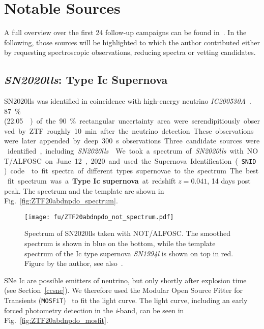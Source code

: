 \section{Notable Sources}
A full overview over the first 24 follow-up campaigns can be found in~. In the following, those sources will be highlighted to which the author contributed either by requesting spectroscopic observations, reducing spectra or vetting candidates.

\subsection{\emph{SN2020lls}: Type Ic Supernova}\label{SN2020lls}
SN2020lls was identified in coincidence with high-energy neutrino \emph{IC200530A}~. \SI{87}{\percent} (\SI{22.05}{\square\deg}) of the \SI{90}{\percent} rectangular uncertainty area were serendipitiously observed by ZTF roughly \SI{10}{\minute} after the neutrino detection. These observations were later appended by deep \SI{300}{\second} observations Three candidate sources were identified, including \emph{SN2020lls}~.

We took a spectrum of \emph{SN2020lls} with NOT/ALFOSC on June 12, 2020 and used the Supernova Identification (\texttt{SNID}) code~ to fit spectra of different types supernovae to the spectrum. The best fit spectrum was a \textbf{Type Ic supernova} at redshift $z=0.041$, 14 days post peak. The spectrum and the template are shown in Fig.~\ref{fig:ZTF20abdnpdo_spectrum}.

\begin{figure}[h!]
    \texttt{[image: fu/ZTF20abdnpdo\_not\_spectrum.pdf]}
    \caption[SN2020lls spectrum]{Spectrum of SN2020lls taken with NOT/ALFOSC. The smoothed spectrum is shown in blue on the bottom, while the template spectrum of the Ic type supernova \emph{SN1994l} is shown on top in red. Figure by the author, see also~\cite{Stein2023a}.}
\end{figure}
SNe Ic are possible emitters of neutrino, but only shortly after explosion time (see Section~\ref{ccsne}). We therefore used the Modular Open Source Fitter for Transients (\texttt{MOSFiT})~ to fit the light curve. The light curve, including an early forced photometry detection in the \textit{i}-band, can be seen in Fig.~\ref{fig:ZTF20abdnpdo_mosfit}.

